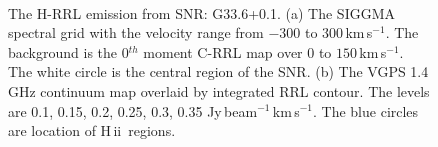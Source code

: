 \documentclass[manuscript]{aastex61}
\newcommand{\hii}{{\rm H\,}{{\sc ii}}}
\newcommand{\kms}{\,km\,s$^{-1}$}
\begin{document}
\begin{figure}[H]
\centering
{} 
\\  
\caption{The H-RRL emission from SNR: G33.6+0.1.
          (a) The SIGGMA spectral grid with the velocity range from $-300$ to $300$\kms.
	  The background is the 0$^{th}$ moment C-RRL map over $0$ to $150$\kms.
	  The white circle is the central region of the SNR.
	  (b) The VGPS 1.4 GHz continuum map overlaid by integrated RRL contour.
	  The levels are 0.1, 0.15, 0.2, 0.25, 0.3, 0.35 Jy\,beam$^{-1}$\kms.
	  The blue circles are location of \hii\ regions.
	  }
\label{fig_snr-g336}
\end{figure}
\end{document}
